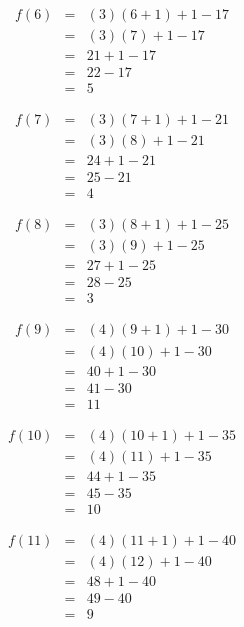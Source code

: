 \documentclass[12pt]{scrartcl}
\begin{document}
\begin{enumerate}
	\begin{eqnarray}
		f(6)		&	=	& 	(3)(6 + 1)  + 1 - 17\nonumber \\
				&	=	&	(3)(7) + 1 - 17 \nonumber \\
				&	=	&	21+ 1 - 17 \nonumber \\
				&	=	&	22 - 17 \nonumber \\
				&	=	&	5 \nonumber
	\end{eqnarray}		
	
	\begin{eqnarray}
		f(7)		&	=	& 	(3)(7 + 1)  + 1 - 21\nonumber \\
				&	=	&	(3)(8) + 1 - 21 \nonumber \\
				&	=	&	24+ 1 - 21 \nonumber \\
				&	=	&	25 - 21 \nonumber \\
				&	=	&	4 \nonumber
	\end{eqnarray}		
	
	\begin{eqnarray}
		f(8)		&	=	& 	(3)(8 + 1)  + 1 - 25\nonumber \\
				&	=	&	(3)(9) + 1 - 25 \nonumber \\
				&	=	&	27+ 1 - 25 \nonumber \\
				&	=	&	28 - 25 \nonumber \\
				&	=	&	3 \nonumber
	\end{eqnarray}	
	
	\begin{eqnarray}
		f(9)		&	=	& 	(4)(9 + 1)  + 1 - 30\nonumber \\
				&	=	&	(4)(10) + 1 - 30 \nonumber \\
				&	=	&	40+ 1 - 30 \nonumber \\
				&	=	&	41 - 30 \nonumber \\
				&	=	&	11 \nonumber
	\end{eqnarray}
	
	\begin{eqnarray}
		f(10)		&	=	& 	(4)(10 + 1)  + 1 - 35\nonumber \\
				&	=	&	(4)(11) + 1 - 35 \nonumber \\
				&	=	&	44+ 1 - 35 \nonumber \\
				&	=	&	45 - 35 \nonumber \\
				&	=	&	10 \nonumber
	\end{eqnarray}
	
	\begin{eqnarray}
		f(11)		&	=	& 	(4)(11 + 1)  + 1 - 40\nonumber \\
				&	=	&	(4)(12) + 1 - 40 \nonumber \\
				&	=	&	48 + 1 - 40 \nonumber \\
				&	=	&	49 - 40 \nonumber \\
				&	=	&	9 \nonumber
	\end{eqnarray}
	

\end{enumerate}
\end{document}
